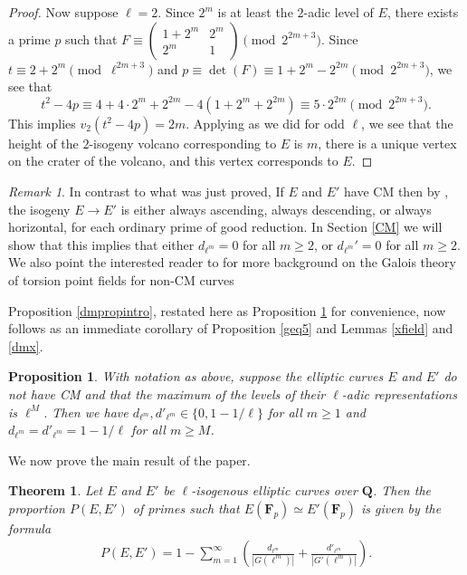 \documentclass{amsart}
\newcommand{\F}{\mathbf{F}}
\newcommand{\Q}{\mathbf{Q}}
\numberwithin{equation}{section}
\theoremstyle{plain}
\newtheorem{thm}[equation]{Theorem}
\newtheorem{prop}[equation]{Proposition}
\theoremstyle{remark}
\newtheorem{rmk}[equation]{Remark}
\begin{document}
\begin{proof}
Now suppose $\ell = 2$.  Since $2^m$ is at least the $2$-adic level of $E$, there exists a prime $p$ such that $F \equiv \left( \begin{smallmatrix} 1 +2^m & 2^{m} \\   2^m & 1 \end{smallmatrix} \right) \pmod{2^{2m+3}}$.  Since $t \equiv 2 + 2^m \pmod{\ell^{2m+3}}$ and $p \equiv \det(F) \equiv 1 + 2^m - 2^{2m} \pmod{2^{2m+3}}$, we see that 
\[
t^2 - 4p \equiv 4 + 4\cdot 2^m + 2^{2m} - 4(1 + 2^m+ 2^{2m}) \equiv 5 \cdot 2^{2m} \pmod{2^{2m+3}}.
\]
This implies $v_2(t^2-4p) = 2m$. Applying \cite[Thm.~7]{sutherland} as we did for odd $\ell$, we see that the height of the $2$-isogeny volcano corresponding to $E$ is $m$, there is a unique vertex on the crater of the volcano, and this vertex corresponds to $E$.
\end{proof}

\begin{rmk}
In contrast to what was just proved, If $E$ and $E'$ have CM then by \cite[Prop.~6.1]{rnt}, the isogeny $E \to E'$ is either always ascending, always descending, or always horizontal, for each ordinary prime of good reduction.  In Section \ref{CM}  we will show that this implies that either $d_{\ell^m} = 0$ for all $m \geq 2$, or $d_{\ell^m}' = 0$ for all $m\geq 2$.  We also point the interested reader to \cite{adelman} for more background on the Galois theory of torsion point fields for non-CM curves
\end{rmk}

Proposition \ref{dmpropintro}, restated here as Proposition \ref{dmpropintro_restated} for convenience,  now follows as an immediate corollary of Proposition \ref{geq5} and Lemmas \ref{xfield} and \ref{dmx}. 

\begin{prop} \label{dmpropintro_restated}
With notation as above, suppose the elliptic curves $E$ and $E'$ do not have CM and  that the maximum of the levels of their $\ell$-adic representations is $\ell^M$.  Then we have $d_{\ell^m}, d'_{\ell^m} \in \lbrace 0,1 - 1/\ell  \rbrace$ for all $m \geq 1$ and $d_{\ell^m} = d'_{\ell^m} = 1-1/\ell$ for all $m \geq M$.
\end{prop}

We now prove the main result of the paper.

\begin{thm} \label{main_thm_restated}
Let $E$ and $E'$ be $\ell$-isogenous elliptic curves over $\Q$.  Then the proportion $P(E,E')$ of primes such that $E(\F_p) \simeq E'(\F_p)$ is given by the formula
\begin{align} \label{main_form2}
P(E,E') = 1 - \sum_{m = 1}^\infty \left( \frac{d_{\ell^m}}{|G(\ell^m)|}  +  \frac{d'_{\ell^m}}{|G'(\ell^m)|} \right).
\end{align}
\end{thm}
\end{document}
